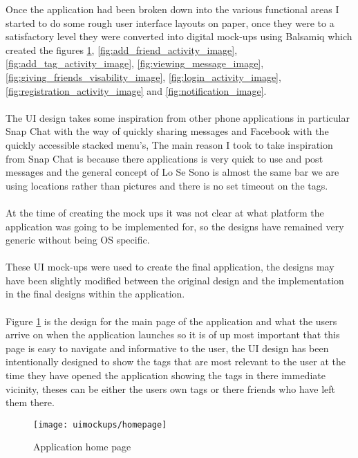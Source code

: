 Once the application had been broken down into the various functional areas I started to do some rough user interface layouts on paper, once they were to a satisfactory level they were converted into digital mock-ups using Balsamiq which created the figures \ref{fig:application_home_page_image}, \ref{fig:add_friend_activity_image}, \ref{fig:add_tag_activity_image}, \ref{fig:viewing_message_image}, \ref{fig:giving_friends_visability_image}, \ref{fig:login_activity_image}, \ref{fig:registration_activity_image} and \ref{fig:notification_image}. \\
\\
The UI design takes some inspiration from other phone applications in particular Snap Chat with the way of quickly sharing messages and Facebook with the quickly accessible stacked menu's, The main reason I took to take inspiration from Snap Chat is because there applications is very quick to use and post messages and the general concept of Lo Se Sono is almost the same bar we are using locations rather than pictures and there is no set timeout on the tags.\\
\\
At the time of creating the mock ups it was not clear at what platform the application was going to be implemented for, so the designs have remained very generic without being OS specific.\\
\\
These UI mock-ups were used to create the final application, the designs may have been slightly modified between the original design and the implementation in the final designs within the application.\\
\\
Figure \ref{fig:application_home_page_image} is the design for the main page of the application and what the users arrive on when the application launches so it is of up most important that this page is easy to navigate and informative to the user, the UI design has been intentionally designed to show the tags that are most relevant to the user at the time they have opened the application showing the tags in there immediate vicinity, theses can be either the users own tags or there friends who have left them there.\\

\begin{figure}[h!]
    \centering
    \texttt{[image: uimockups/homepage]}
    \caption{Application home page}
    \label{fig:application_home_page_image}
\end{figure}

